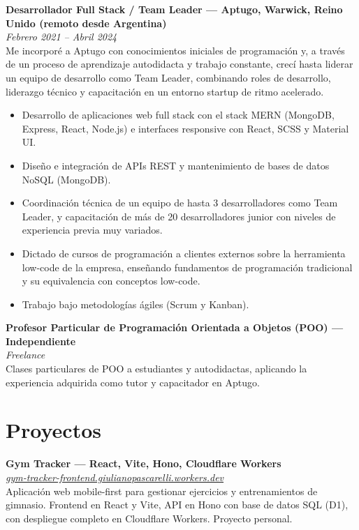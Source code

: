 \documentclass[10pt,a4paper]{article}
\newcommand{\entryheader}[2]{\textbf{#1}\\ \textit{#2}\\[1pt]}
\begin{document}
\vspace{2pt}
\entryheader{Desarrollador Full Stack / Team Leader --- Aptugo, Warwick, Reino Unido (remoto desde Argentina)}{Febrero 2021 -- Abril 2024}
Me incorporé a Aptugo con conocimientos iniciales de programación y, a través de un proceso de aprendizaje autodidacta y trabajo constante, crecí hasta liderar un equipo de desarrollo como Team Leader, combinando roles de desarrollo, liderazgo técnico y capacitación en un entorno startup de ritmo acelerado.
\begin{itemize}[noitemsep, topsep=1pt, partopsep=0pt, leftmargin=16pt]
    \item Desarrollo de aplicaciones web full stack con el stack MERN (MongoDB, Express, React, Node.js) e interfaces responsive con React, SCSS y Material UI.
    \item Diseño e integración de APIs REST y mantenimiento de bases de datos NoSQL (MongoDB).
    \item Coordinación técnica de un equipo de hasta 3 desarrolladores como Team Leader, y capacitación de más de 20 desarrolladores junior con niveles de experiencia previa muy variados.
    \item Dictado de cursos de programación a clientes externos sobre la herramienta low-code de la empresa, enseñando fundamentos de programación tradicional y su equivalencia con conceptos low-code.
    \item Trabajo bajo metodologías ágiles (Scrum y Kanban).
\end{itemize}

\vspace{2pt}
\entryheader{Profesor Particular de Programación Orientada a Objetos (POO) --- Independiente}{Freelance}
Clases particulares de POO a estudiantes y autodidactas, aplicando la experiencia adquirida como tutor y capacitador en Aptugo.

\section*{Proyectos}

\entryheader{Gym Tracker --- React, Vite, Hono, Cloudflare Workers}{\href{https://gym-tracker-frontend.giulianopascarelli.workers.dev/}{gym-tracker-frontend.giulianopascarelli.workers.dev}}
Aplicación web mobile-first para gestionar ejercicios y entrenamientos de gimnasio. Frontend en React y Vite, API en Hono con base de datos SQL (D1), con despliegue completo en Cloudflare Workers. Proyecto personal.
\end{document}
